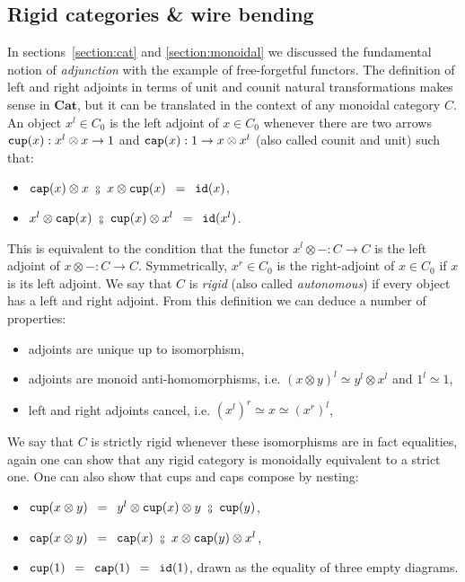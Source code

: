 
\subsection{Rigid categories \& wire bending} \label{subsection:rigid}

In sections~\ref{section:cat} and \ref{section:monoidal} we discussed the fundamental notion of \emph{adjunction} with the example of free-forgetful functors.
The definition of left and right adjoints in terms of unit and counit natural transformations makes sense in $\mathbf{Cat}$, but it can be translated in the context of any monoidal category $C$.
An object $x^l \in C_0$ is the left adjoint of $x \in C_0$ whenever there are two arrows $\mathtt{cup}(x) : x^l \otimes x \to 1$ and $\mathtt{cap}(x) : 1 \to x \otimes x^l$ (also called counit and unit) such that:
\begin{itemize}
\item $\ttcap(x) \otimes x \ \fcmp \ x \otimes \ttcup(x) \s = \s \id(x)$,
\item $x^l \otimes \ttcap(x) \ \fcmp \ \ttcup(x) \otimes x^l \s = \s \id(x^l)$.
\end{itemize}
This is equivalent to the condition that the functor $x^l \otimes - : C \to C$ is the left adjoint of $x \otimes - : C \to C$.
Symmetrically, $x^r \in C_0$ is the right-adjoint of $x \in C_0$ if $x$ is its left adjoint.
We say that $C$ is \emph{rigid} (also called \emph{autonomous}) if every object has a left and right adjoint.
From this definition we can deduce a number of properties:
\begin{itemize}
    \item adjoints are unique up to isomorphism,
    \item adjoints are monoid anti-homomorphisms, i.e. $(x \otimes y)^l \simeq y^l \otimes x^l$ and $1^l \simeq 1$,
    \item left and right adjoints cancel, i.e. $(x^l)^r \simeq x \simeq (x^r)^l$,
\end{itemize}
We say that $C$ is strictly rigid whenever these isomorphisms are in fact equalities, again one can show that any rigid category is monoidally equivalent to a strict one.
One can also show that cups and caps compose by nesting:
\begin{itemize}
\item $\ttcup(x \otimes y) \s = \s y^l \otimes \ttcup(x) \otimes y \ \fcmp \ \ttcup(y)$,
\item $\ttcap(x \otimes y) \s = \s \ttcap(x) \ \fcmp \ x \otimes \ttcap(y) \otimes x^l$,
\item $\mathtt{cup}(1) \enspace = \enspace \mathtt{cap}(1) \enspace = \enspace \mathtt{id}(1)$, drawn as the equality of three empty diagrams.
\end{itemize}
